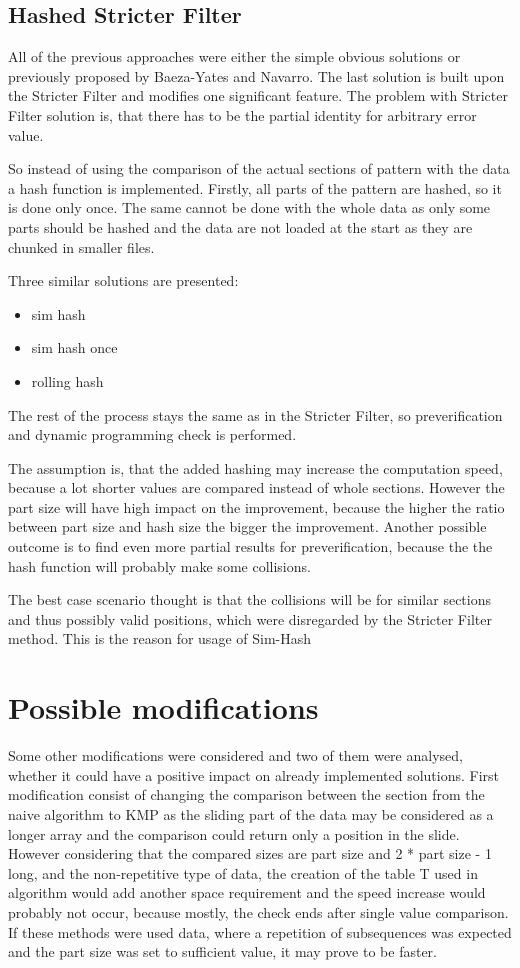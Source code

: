 \subsection{Hashed Stricter Filter }
All of the previous approaches were either the simple obvious solutions or previously proposed by Baeza-Yates and Navarro. The last solution is built upon the Stricter Filter and modifies one significant feature. The problem with Stricter Filter solution is, that there has to be the partial identity for arbitrary error value.

So instead of using the comparison of the actual sections of pattern with the data a hash function is implemented. Firstly, all parts of the pattern are hashed, so it is done only once. The same cannot be done with the whole data as only some parts should be hashed and the data are not loaded at the start as they are chunked in smaller files.

Three similar solutions are presented:

\begin{itemize}
\item sim hash %
\item sim hash once %
\item rolling hash %
\end{itemize}

The rest of the process stays the same as in the Stricter Filter, so preverification and dynamic programming check is performed.

The assumption is, that the added hashing may increase the computation speed, because a lot shorter values are compared instead of whole sections. However the part size will have high impact on the improvement, because the higher the ratio between part size and hash size the bigger the improvement. Another possible outcome is to find even more partial results for preverification, because the the hash function will probably make some collisions.

The best case scenario thought is that the collisions will be for similar sections and thus possibly valid positions, which were disregarded by the Stricter Filter method. This is the reason for usage of Sim-Hash %

\section{Possible modifications}
Some other modifications were considered and two of them were analysed, whether it could have a positive impact on already implemented solutions. First modification consist of changing the comparison between the section from the naive algorithm to KMP as the sliding part of the data may be considered as a longer array and the comparison could return only a position in the slide. However considering that the compared sizes are part size and 2 * part size - 1 long, and the non-repetitive type of data, the creation of the table T used in algorithm would add another space requirement and the speed increase would probably not occur, because mostly, the check ends after single value comparison. If these methods were used data, where a repetition of subsequences was expected and the part size was set to sufficient value, it may prove to be faster.

